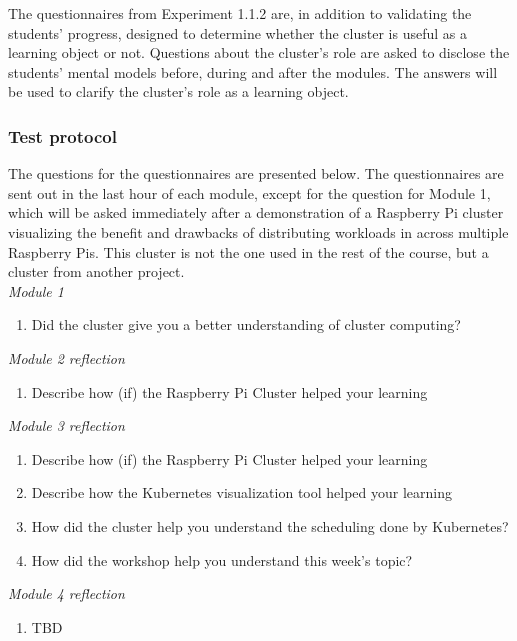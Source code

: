 \noindent The questionnaires from Experiment 1.1.2 are, in addition to validating the students' progress, designed to determine whether the cluster is useful as a learning object or not. Questions about the cluster's role are asked to disclose the students' mental models before, during and after the modules. The answers will be used to clarify the cluster's role as a learning object.

\subsubsection*{Test protocol}
  
\noindent The questions for the questionnaires are presented below. The questionnaires are sent out in the last hour of each module, except for the question for Module 1, which will be asked immediately after a demonstration of a Raspberry Pi cluster visualizing the benefit and drawbacks of distributing workloads in across multiple Raspberry Pis. This cluster is not the one used in the rest of the course, but a cluster from another project. \\

\noindent
\textit{Module 1}
\begin{enumerate}
\setlength\itemsep{0.05em}
	\item Did the cluster give you a better understanding of cluster computing?
\end{enumerate}

\noindent
\textit{Module 2 reflection}
\begin{enumerate}
\setlength\itemsep{0.05em}
	\item Describe how (if) the Raspberry Pi Cluster helped your learning
\end{enumerate}

\noindent
\textit{Module 3 reflection}
\begin{enumerate}
\setlength\itemsep{0.05em}
	\item Describe how (if) the Raspberry Pi Cluster helped your learning
	\item Describe how the Kubernetes visualization tool helped your learning
	\item How did the cluster help you understand the scheduling done by Kubernetes?
	\item How did the workshop help you understand this week's topic? 
\end{enumerate}

\noindent
\textit{Module 4 reflection}
\begin{enumerate}
\setlength\itemsep{0.05em}
	\item TBD
\end{enumerate}

